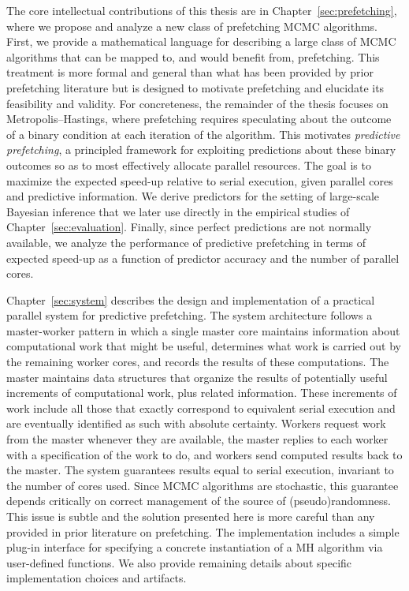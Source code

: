 \documentclass[angelino.tex]{subfiles}
\begin{document}
The core intellectual contributions of this thesis are in
Chapter~\ref{sec:prefetching}, where we propose and analyze a new class of
prefetching MCMC algorithms.
First, we provide a mathematical language for describing a large class
of MCMC algorithms that can be mapped to, and would benefit from, prefetching.
This treatment is more formal and general than what has been provided by
prior prefetching literature but is designed to motivate prefetching
and elucidate its feasibility and validity.
For concreteness, the remainder of the thesis focuses on Metropolis--Hastings,
where prefetching requires speculating about the outcome of a binary condition
at each iteration of the algorithm.
This motivates \emph{predictive prefetching},
a principled framework for exploiting predictions about these binary outcomes
so as to most effectively allocate parallel resources.
The goal is to maximize the expected speed-up relative to serial execution,
given parallel cores and predictive information.
We derive predictors for the setting of large-scale Bayesian inference that
we later use directly in the empirical studies of Chapter~\ref{sec:evaluation}.
Finally, since perfect predictions are not normally available,
we analyze the performance of predictive prefetching in terms of expected
speed-up as a function of predictor accuracy and the number of parallel cores.

Chapter~\ref{sec:system} describes the design and implementation
of a practical parallel system for predictive prefetching.
The system architecture follows a master-worker pattern in which a single master
core maintains information about computational work that might be useful,
determines what work is carried out by the remaining worker cores,
and records the results of these computations.
The master maintains data structures that organize the results of potentially
useful increments of computational work, plus related information.
These increments of work include all those that exactly correspond to equivalent
serial execution and are eventually identified as such with absolute certainty.
Workers request work from the master whenever they are available,
the master replies to each worker with a specification of the work to do,
and workers send computed results back to the master.
The system guarantees results equal to serial execution,
\ie invariant to the number of cores used.
Since MCMC algorithms are stochastic, this guarantee depends critically
on correct management of the source of (pseudo)randomness.
This issue is subtle and the solution presented here is more careful
than any provided in prior literature on prefetching.
The implementation includes a simple plug-in interface for specifying
a concrete instantiation of a MH algorithm via user-defined functions.
We also provide remaining details about specific implementation choices and
artifacts.
\end{document}
